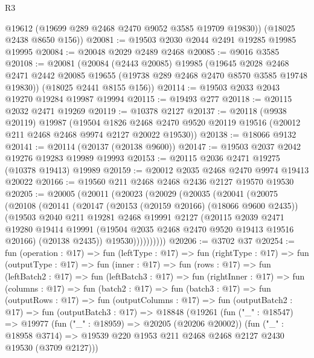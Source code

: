 \begin{lexlean}{R3}
\begin{coremodule}
        @19612
        (@19699 @289 @2468 @2470 @9052 @3585 @19709 @19830))
      (@18025 @2438 @8650 @156))
@20081 := @19503 @2030 @2044 @2491 @19285 @19985 @19995
@20084 := @20048 @2029 @2489 @2468
@20085 := @9016 @3585
@20108 := @20081
    (@20084
      (@2443 @20085)
      @19985
      (@19645
        @2028
        @2468
        @2471
        @2442
        @20085
        @19655
        (@19738 @289 @2468 @2470 @8570 @3585 @19748 @19830))
      (@18025 @2441 @8155 @156))
@20114 := @19503 @2033 @2043 @19270 @19284 @19987 @19994
@20115 := @19493 @277
@20118 := @20115 @2032 @2471 @19269
@20119 := @10378 @2127
@20137 := @20118
    (@9938 @20119)
    @19987
    (@19504
      @1826
      @2468
      @2470
      @9520
      @20119
      @19516
      (@20012 @211 @2468 @2468 @9974 @2127 @20022 @19530))
@20138 := @18066 @9132
@20141 := @20114 (@20137 (@20138 @9600))
@20147 := @19503 @2037 @2042 @19276 @19283 @19989 @19993
@20153 := @20115 @2036 @2471 @19275 (@10378 @19413) @19989
@20159 := @20012 @2035 @2468 @2470 @9974 @19413 @20022
@20166 := @19560 @211 @2468 @2468 @2436 @2127 @19570 @19530
@20205 := @20005
    (@20011
      (@20023
        (@20029
          (@20035
            (@20041
              (@20075
                (@20108
                  (@20141
                    (@20147
                      (@20153 (@20159 @20166) (@18066 @9600 @2435))
                      (@19503
                        @2040
                        @211
                        @19281
                        @2468
                        @19991
                        @2127
                        (@20115
                          @2039
                          @2471
                          @19280
                          @19414
                          @19991
                          (@19504 @2035 @2468 @2470 @9520 @19413 @19516 @20166)
                          (@20138 @2435))
                        @19530))))))))))
@20206 := @3702 @37
@20254 := fun (operation : @17) =>
  fun (leftType : @17) =>
  fun (rightType : @17) =>
  fun (outputType : @17) =>
  fun (inner : @17) =>
  fun (rows : @17) =>
  fun (leftBatch2 : @17) =>
  fun (leftBatch3 : @17) =>
  fun (rightInner : @17) =>
  fun (columns : @17) =>
  fun (batch2 : @17) =>
  fun (batch3 : @17) =>
  fun (outputRows : @17) =>
  fun (outputColumns : @17) =>
  fun (outputBatch2 : @17) =>
  fun (outputBatch3 : @17) =>
  @18848
    (@19261
      (fun ("_" : @18547) =>
      @19977
        (fun ("_" : @18959) => @20205 (@20206 @20002))
        (fun ("_" : @18958 @3714) =>
        @19539 @220 @1953 @211 @2468 @2468 @2127 @2430 @19530 (@3709 @2127)))

\end{coremodule}
\end{lexlean}
